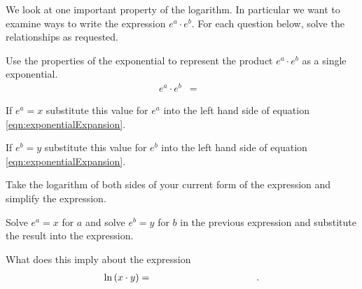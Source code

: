 \begin{problem}
\item We look at one important property of the logarithm. In
  particular we want to examine ways to write the expression
  $e^a\cdot e^b$. For each question below, solve the relationships as
  requested.
  \label{problem:exponenetialPropOne}
  \begin{subproblem}
  \item Use the properties of the exponential to represent the product
    $e^a\cdot e^b$ as a single exponential.
    \label{subprob:exponentialExpansion}
    \begin{eqnarray}
      \label{eqn:exponentialExpansion}
      e^a \cdot e^b & = &
    \end{eqnarray}
  \item If $e^a=x$ substitute this value for $e^a$ into the left hand
    side of equation \ref{eqn:exponentialExpansion}.
    \vspace{4em}
  \item If $e^b=y$ substitute this value for $e^b$ into the left hand
    side of equation \ref{eqn:exponentialExpansion}.
    \vspace{4em}
  \item Take the logarithm of both sides of your current form of the
    expression and simplify the expression.
    \vfill
  \item Solve $e^a=x$ for $a$ and solve $e^b=y$ for $b$ in the
    previous expression and substitute the result into the expression.
    \vfill
  \item What does this imply about the expression
    \begin{eqnarray*}
      \ln\lp x \cdot y \rp & = & \hspace{10em}.
    \end{eqnarray*}
  \end{subproblem}

  \clearpage


\end{problem}
